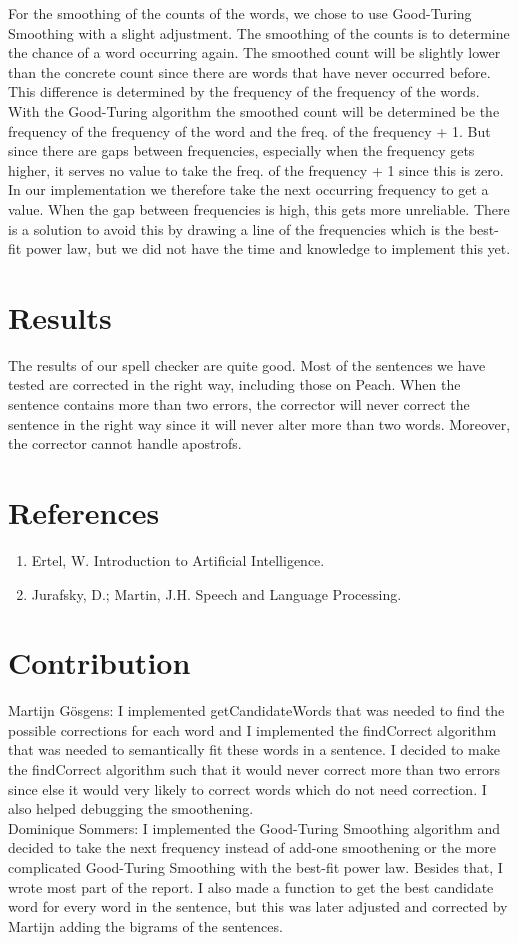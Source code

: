 \documentclass[a4paper,twoside,11pt]{article}
\begin{document}
For the smoothing of the counts of the words, we chose to use Good-Turing Smoothing with a slight adjustment. The smoothing of the counts is to determine the chance of a word occurring again. The smoothed count will be slightly lower than the concrete count since there are words that have never occurred before. This difference is determined by the frequency of the frequency of the words. With the Good-Turing algorithm the smoothed count will be determined be the frequency of the frequency of the word and the freq. of the frequency + 1. But since there are gaps between frequencies, especially when the frequency gets higher, it serves no value to take the freq. of the frequency + 1 since this is zero. In our implementation we therefore take the next occurring frequency to get a value. When the gap between frequencies is high, this gets more unreliable. There is a solution to avoid this by drawing a line of the frequencies which is the best-fit power law, but we did not have the time and knowledge to implement this yet.

\section{Results}
The results of our spell checker are quite good. Most of the sentences we have tested are corrected in the right way, including those on Peach. When the sentence contains more than two errors, the corrector will never correct the sentence in the right way since it will never alter more than two words. Moreover, the corrector cannot handle apostrofs.

\section{References}
\begin{enumerate}
\item Ertel, W. Introduction to Artificial Intelligence.
\item Jurafsky, D.; Martin, J.H. Speech and Language Processing.
\end{enumerate}

\section{Contribution}
Martijn Gösgens: I implemented getCandidateWords that was needed to find the possible corrections for each word and I implemented the findCorrect algorithm that was needed to semantically fit these words in a sentence. I decided to make the findCorrect algorithm such that it would never correct more than two errors since else it would very likely to correct words which do not need correction. I also helped debugging the smoothening.\\
Dominique Sommers: I implemented the Good-Turing Smoothing algorithm and decided to take the next frequency instead of add-one smoothening or the more complicated Good-Turing Smoothing with the best-fit power law. Besides that, I wrote most part of the report. I also made a function to get the best candidate word for every word in the sentence, but this was later adjusted and corrected by Martijn adding the bigrams of the sentences.
\end{document}
